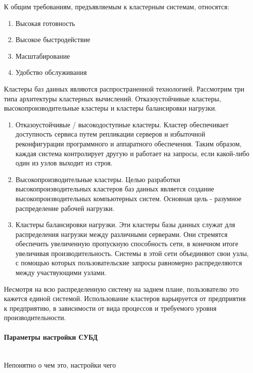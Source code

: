  К общим требованиям, предъявляемым к кластерным системам, относятся:
\begin{enumerate}
    \item Высокая готовность
    \item Высокое быстродействие
    \item Масштабирование
    \item Удобство обслуживания
\end{enumerate}

Кластеры баз данных являются распространенной технологией.  Рассмотрим три типа архитектуры кластерных вычислений. Отказоустойчивые кластеры, высокопроизводительные кластеры и кластеры балансировки нагрузки.

\begin{enumerate}
\item Отказоустойчивые / высокодоступные кластеры. Кластер обеспечивает доступность сервиса путем репликации серверов и избыточной реконфигурации программного и аппаратного обеспечения. Таким образом, каждая система контролирует другую и работает на запросы, если какой-либо один из узлов выходит из строя.

\item Высокопроизводительные кластеры. Целью разработки высокопроизводительных кластеров баз данных является создание высокопроизводительных компьютерных систем. Основная цель - разумное распределение рабочей нагрузки.

\item Кластеры балансировки нагрузки. Эти кластеры базы данных служат для распределения нагрузки между различными серверами. Они стремятся обеспечить увеличенную пропускную способность сети, в конечном итоге увеличивая производительность. Системы в этой сети объединяют свои узлы, с помощью которых пользовательские запросы равномерно распределяются между участвующими узлами. 
\end{enumerate}

Несмотря на всю распределенную систему на заднем плане, пользователю это кажется единой системой. Использование кластеров варьируется от предприятия к предприятию, в зависимости от вида процессов и требуемого уровня производительности.
\paragraph{Параметры настройки СУБД}~\\
Непонятно о чем это, настройки чего~\\ 

